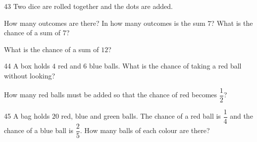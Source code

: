 \gap
\begin{probbox}{43}{}
Two dice are rolled together and the dots are added.\par
{} How many outcomes are there? \quad {} In how many outcomes is the sum $7$? What is the chance of a sum of $7$?\par
{} What is the chance of a sum of $12$?
\end{probbox}
\gap
\begin{probbox}{44}{}
A box holds $4$ red and $6$ blue balls.  What is the chance of taking a red ball without looking?\par
{} How many red balls must be added so that the chance of red becomes $\dfrac12$?
\end{probbox}
\gap
\begin{probbox}{45}{}
A bag holds $20$ red, blue and green balls. The chance of a red ball is $\dfrac14$ and the chance of a blue ball is $\dfrac25$. How many balls of each colour are there?
\end{probbox}
\gap
\needspace{7.5cm}
